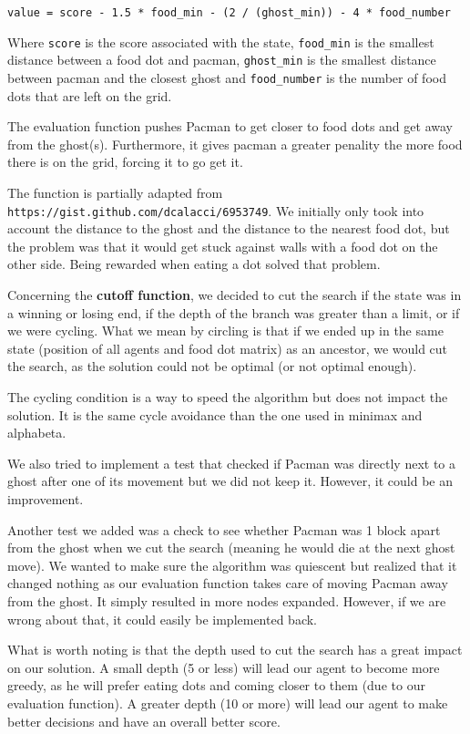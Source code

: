 \documentclass[a4paper, 11pt]{article}
\begin{document}
	\texttt{value = score - 1.5 * food\_min - (2 / (ghost\_min)) - 4 * food\_number}
	
	Where \texttt{score} is the score associated with the state, \texttt{food\_min} is the smallest distance between a food dot and pacman, \texttt{ghost\_min} is the smallest distance between pacman and the closest ghost and \texttt{food\_number} is the number of food dots that are left on the grid.
	
	The evaluation function pushes Pacman to get closer to food dots and get away from the ghost(s). Furthermore, it gives pacman a greater penality the more food there is on the grid, forcing it to go get it.
	
	The function is partially adapted from \texttt{https://gist.github.com/dcalacci/6953749}. We initially only took into account the distance to the ghost and the distance to the nearest food dot, but the problem was that it would get stuck against walls with a food dot on the other side. Being rewarded when eating a dot solved that problem.
	
	
	Concerning the \textbf{cutoff function}, we decided to cut the search if the state was in a winning or losing end, if the depth of the branch was greater than a limit, or if we were cycling. What we mean by circling is that if we ended up in the same state (position of all agents and food dot matrix) as an ancestor, we would cut the search, as the solution could not be optimal (or not optimal enough).
	
	The cycling condition is a way to speed the algorithm but does not impact the solution. It is the same cycle avoidance than the one used in minimax and alphabeta.
	
	We also tried to implement a test that checked if Pacman was directly next to a ghost after one of its movement but we did not keep it. However, it could be an improvement.
	
	Another test we added was a check to see whether Pacman was 1 block apart from the ghost when we cut the search (meaning he would die at the next ghost move). We wanted to make sure the algorithm was quiescent but realized that it changed nothing as our evaluation function takes care of moving Pacman away from the ghost. It simply resulted in more nodes expanded. However, if we are wrong about that, it could easily be implemented back.
	
	What is worth noting is that the depth used to cut the search has a great impact on our solution. A small depth (5 or less) will lead our agent to become more greedy, as he will prefer eating dots and coming closer to them (due to our evaluation function). A greater depth (10 or more) will lead our agent to make better decisions and have an overall better score.
	
\end{document}
